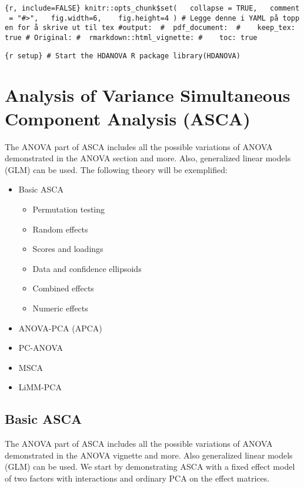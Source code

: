 \texttt{\{r,\ include=FALSE\}\ knitr::opts\_chunk\$set(\ \ \ collapse\ =\ TRUE,\ \ \ comment\ =\ "\#\textgreater{}",\ \ \ fig.width=6,\ \ \ \ fig.height=4\ )\ \#\ Legge\ denne\ i\ YAML\ på\ toppen\ for\ å\ skrive\ ut\ til\ tex\ \#output:\ \ \#\ \ pdf\_document:\ \ \#\ \ \ \ keep\_tex:\ true\ \#\ Original:\ \#\ \ rmarkdown::html\_vignette:\ \#\ \ \ \ toc:\ true}

\texttt{\{r\ setup\}\ \#\ Start\ the\ HDANOVA\ R\ package\ library(HDANOVA)}

\section{Analysis of Variance Simultaneous Component Analysis
(ASCA)}\label{analysis-of-variance-simultaneous-component-analysis-asca}

The ANOVA part of ASCA includes all the possible variations of ANOVA
demonstrated in the ANOVA section and more. Also, generalized linear
models (GLM) can be used. The following theory will be exemplified:

\begin{itemize}
\tightlist
\item
  Basic ASCA

  \begin{itemize}
  \tightlist
  \item
    Permutation testing
  \item
    Random effects
  \item
    Scores and loadings
  \item
    Data and confidence ellipsoids
  \item
    Combined effects
  \item
    Numeric effects
  \end{itemize}
\item
  ANOVA-PCA (APCA)
\item
  PC-ANOVA
\item
  MSCA
\item
  LiMM-PCA
\end{itemize}

\subsection{Basic ASCA}\label{basic-asca}

The ANOVA part of ASCA includes all the possible variations of ANOVA
demonstrated in the ANOVA vignette and more. Also generalized linear
models (GLM) can be used. We start by demonstrating ASCA with a fixed
effect model of two factors with interactions and ordinary PCA on the
effect matrices.

